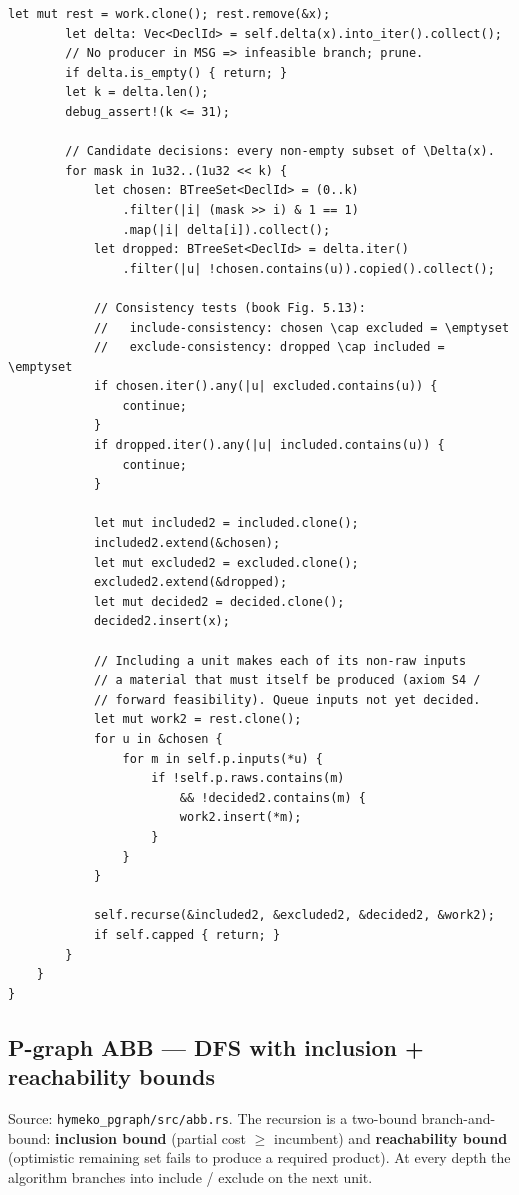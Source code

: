 \documentclass[11pt]{article}
\begin{document}
\begin{lstlisting}[style=ruststyle]
        let mut rest = work.clone(); rest.remove(&x);
        let delta: Vec<DeclId> = self.delta(x).into_iter().collect();
        // No producer in MSG => infeasible branch; prune.
        if delta.is_empty() { return; }
        let k = delta.len();
        debug_assert!(k <= 31);

        // Candidate decisions: every non-empty subset of \Delta(x).
        for mask in 1u32..(1u32 << k) {
            let chosen: BTreeSet<DeclId> = (0..k)
                .filter(|i| (mask >> i) & 1 == 1)
                .map(|i| delta[i]).collect();
            let dropped: BTreeSet<DeclId> = delta.iter()
                .filter(|u| !chosen.contains(u)).copied().collect();

            // Consistency tests (book Fig. 5.13):
            //   include-consistency: chosen \cap excluded = \emptyset
            //   exclude-consistency: dropped \cap included = \emptyset
            if chosen.iter().any(|u| excluded.contains(u)) {
                continue;
            }
            if dropped.iter().any(|u| included.contains(u)) {
                continue;
            }

            let mut included2 = included.clone();
            included2.extend(&chosen);
            let mut excluded2 = excluded.clone();
            excluded2.extend(&dropped);
            let mut decided2 = decided.clone();
            decided2.insert(x);

            // Including a unit makes each of its non-raw inputs
            // a material that must itself be produced (axiom S4 /
            // forward feasibility). Queue inputs not yet decided.
            let mut work2 = rest.clone();
            for u in &chosen {
                for m in self.p.inputs(*u) {
                    if !self.p.raws.contains(m)
                        && !decided2.contains(m) {
                        work2.insert(*m);
                    }
                }
            }

            self.recurse(&included2, &excluded2, &decided2, &work2);
            if self.capped { return; }
        }
    }
}
\end{lstlisting}

\subsection{P-graph ABB --- DFS with inclusion + reachability bounds}
\label{app:code-pgraph-abb}

Source: \texttt{hymeko\_pgraph/src/abb.rs}. The recursion is a
two-bound branch-and-bound: \textbf{inclusion bound} (partial cost
$\geq$ incumbent) and \textbf{reachability bound} (optimistic
remaining set fails to produce a required product). At every depth
the algorithm branches into include / exclude on the next unit.
\end{document}
